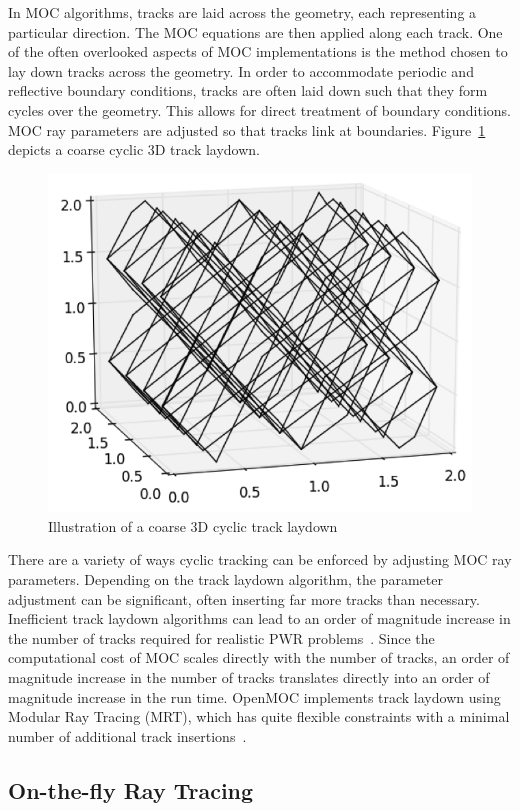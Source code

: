 \documentclass[12pt,twoside]{mitthesis-exec}
\begin{document}
In MOC algorithms, tracks are laid across the geometry, each representing a particular direction. The MOC equations are then applied along each track. One of the often overlooked aspects of MOC implementations is the method chosen to lay down tracks across the geometry. In order to accommodate periodic and reflective boundary conditions, tracks are often laid down such that they form cycles over the geometry. This allows for direct treatment of boundary conditions. MOC ray parameters are adjusted so that tracks link at boundaries. Figure~\ref{fig:sample-tracks} depicts a coarse cyclic 3D track laydown.

\begin{figure}[h!]
	\centering
	\includegraphics[width=0.5\linewidth]{figures/laydown/sample-tracks_b.png}
	\caption{Illustration of a coarse 3D cyclic track laydown}
	\label{fig:sample-tracks}
\end{figure}

There are a variety of ways cyclic tracking can be enforced by adjusting MOC ray parameters. Depending on the track laydown algorithm, the parameter adjustment can be significant, often inserting far more tracks than necessary. Inefficient track laydown algorithms can lead to an order of magnitude increase in the number of tracks required for realistic PWR problems~\cite{shaner-laydown}. Since the computational cost of MOC scales directly with the number of tracks, an order of magnitude increase in the number of tracks translates directly into an order of magnitude increase in the run time. OpenMOC implements track laydown using Modular Ray Tracing (MRT), which has quite flexible constraints with a minimal number of additional track insertions~\cite{liu_mrt}.


\subsection*{On-the-fly Ray Tracing}
\end{document}
